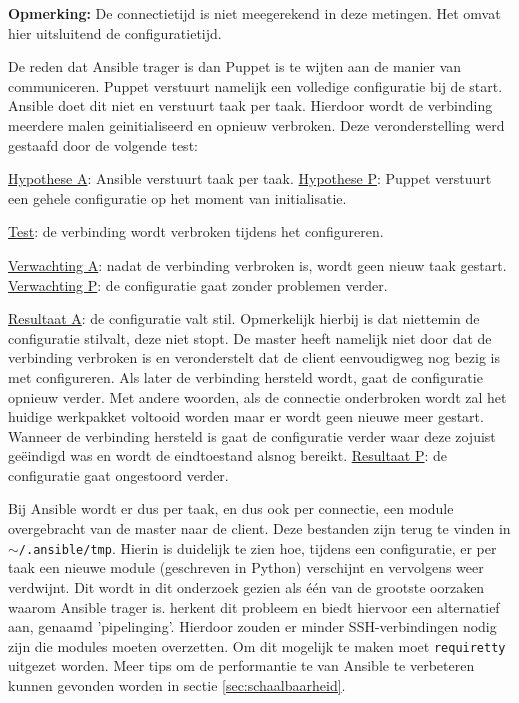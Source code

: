 \textbf{Opmerking:} De \gls{connectietijd} is niet meegerekend in deze metingen. Het omvat hier uitsluitend de \gls{configuratietijd}.

De reden dat Ansible trager is dan Puppet is te wijten aan de manier van communiceren. Puppet verstuurt namelijk een volledige configuratie bij de start. Ansible doet dit niet en verstuurt taak per taak. Hierdoor wordt de verbinding meerdere malen geinitialiseerd en opnieuw verbroken. Deze veronderstelling werd gestaafd door de volgende test:

\begin{addmargin}[2em]{0cm}
\underline{Hypothese A}: Ansible verstuurt taak per taak.\newline
\underline{Hypothese P}: Puppet verstuurt een gehele configuratie op het moment van initialisatie.

\underline{Test}: de verbinding wordt verbroken tijdens het configureren.

\underline{Verwachting A}: nadat de verbinding verbroken is, wordt geen nieuw taak gestart.\newline
\underline{Verwachting P}: de configuratie gaat zonder problemen verder.

\underline{Resultaat A}: de configuratie valt stil. Opmerkelijk hierbij is dat niettemin de configuratie stilvalt, deze niet stopt. De master heeft namelijk niet door dat de verbinding verbroken is en veronderstelt dat de client eenvoudigweg nog bezig is met configureren. Als later de verbinding hersteld wordt, gaat de configuratie opnieuw verder. Met andere woorden, als de connectie onderbroken wordt zal het huidige \gls{werkpakket} voltooid worden maar er wordt geen nieuwe  meer gestart. Wanneer de verbinding hersteld is gaat de configuratie verder waar deze zojuist ge\"eindigd was en wordt de eindtoestand alsnog bereikt. \newline
\underline{Resultaat P}: de configuratie gaat ongestoord verder.
\end{addmargin}

Bij Ansible wordt er dus per taak, en dus ook per connectie, een module overgebracht van de master naar de client. Deze bestanden zijn terug te vinden in \texttt{$\sim$/.ansible/tmp}. Hierin is duidelijk te zien hoe, tijdens een configuratie, er per taak een nieuwe module (geschreven in Python) verschijnt en vervolgens weer verdwijnt. Dit wordt in dit onderzoek gezien als \'e\'en van de grootste oorzaken waarom Ansible trager is.  \textcite{AnsibleTuning} herkent dit probleem en biedt hiervoor een alternatief aan, genaamd 'pipelinging'. Hierdoor zouden er minder SSH-verbindingen nodig zijn die modules moeten overzetten. Om dit mogelijk te maken moet \texttt{requiretty} uitgezet worden. Meer tips om de performantie te van Ansible te verbeteren kunnen gevonden worden in sectie \ref{sec:schaalbaarheid}.


